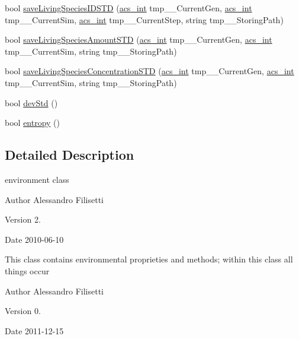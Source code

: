 \begin{DoxyCompactItemize}
\item 
bool \hyperlink{classenvironment_a623c3cda23a18cb7b039c5a666408d72}{save\-Living\-Species\-I\-D\-S\-T\-D} (\hyperlink{acs__headers_8h_a8d277355641a098190360234e2ebde35}{acs\-\_\-int} tmp\-\_\-\-\_\-\-Current\-Gen, \hyperlink{acs__headers_8h_a8d277355641a098190360234e2ebde35}{acs\-\_\-int} tmp\-\_\-\-\_\-\-Current\-Sim, \hyperlink{acs__headers_8h_a8d277355641a098190360234e2ebde35}{acs\-\_\-int} tmp\-\_\-\-\_\-\-Current\-Step, string tmp\-\_\-\-\_\-\-Storing\-Path)
\item 
bool \hyperlink{classenvironment_a26c70b0a84c37c87952628d4a328c238}{save\-Living\-Species\-Amount\-S\-T\-D} (\hyperlink{acs__headers_8h_a8d277355641a098190360234e2ebde35}{acs\-\_\-int} tmp\-\_\-\-\_\-\-Current\-Gen, \hyperlink{acs__headers_8h_a8d277355641a098190360234e2ebde35}{acs\-\_\-int} tmp\-\_\-\-\_\-\-Current\-Sim, string tmp\-\_\-\-\_\-\-Storing\-Path)
\item 
bool \hyperlink{classenvironment_aedf8d90e1fe734948bf2213489840582}{save\-Living\-Species\-Concentration\-S\-T\-D} (\hyperlink{acs__headers_8h_a8d277355641a098190360234e2ebde35}{acs\-\_\-int} tmp\-\_\-\-\_\-\-Current\-Gen, \hyperlink{acs__headers_8h_a8d277355641a098190360234e2ebde35}{acs\-\_\-int} tmp\-\_\-\-\_\-\-Current\-Sim, string tmp\-\_\-\-\_\-\-Storing\-Path)
\item 
bool \hyperlink{classenvironment_ae7fd21d14f81c4854b3a6163b0278857}{dev\-Std} ()
\item 
bool \hyperlink{classenvironment_a4e9b60ec8b05e888cf0e55def03ee906}{entropy} ()
\end{DoxyCompactItemize}


\subsection{Detailed Description}
environment class 

\begin{DoxyAuthor}{Author}
Alessandro Filisetti 
\end{DoxyAuthor}
\begin{DoxyVersion}{Version}
2. 
\end{DoxyVersion}
\begin{DoxyDate}{Date}
2010-\/06-\/10
\end{DoxyDate}
This class contains environmental proprieties and methods; within this class all things occur \begin{DoxyAuthor}{Author}
Alessandro Filisetti 
\end{DoxyAuthor}
\begin{DoxyVersion}{Version}
0. 
\end{DoxyVersion}
\begin{DoxyDate}{Date}
2011-\/12-\/15 
\end{DoxyDate}


